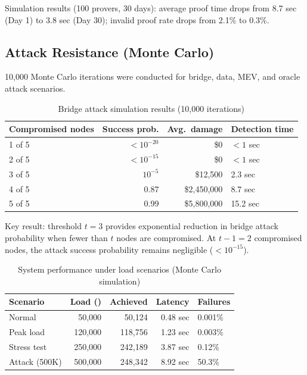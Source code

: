\documentclass[12pt,a4paper]{article}
\theoremstyle{definition}
\theoremstyle{remark}
\newcommand{\TPS}{\text{TPS}}
\begin{document}
Simulation results (100 provers, 30 days): average proof time drops from 8.7 sec (Day 1) to 3.8 sec (Day 30); invalid proof rate drops from 2.1\% to 0.3\%.

\subsection{Attack Resistance (Monte Carlo)}

10,000 Monte Carlo iterations were conducted for bridge, data, MEV, and oracle attack scenarios.

\begin{table}[H]
\centering
\small
\caption{Bridge attack simulation results (10,000 iterations)}
\label{tab:mc-bridge}
\begin{tabular}{lrrl}
\toprule
\textbf{Compromised nodes} & \textbf{Success prob.} & \textbf{Avg.\ damage} & \textbf{Detection time} \\
\midrule
1 of 5 & $< 10^{-20}$ & \$0 & $< 1$ sec \\
2 of 5 & $< 10^{-15}$ & \$0 & $< 1$ sec \\
3 of 5 & $10^{-5}$ & \$12,500 & 2.3 sec \\
4 of 5 & 0.87 & \$2,450,000 & 8.7 sec \\
5 of 5 & 0.99 & \$5,800,000 & 15.2 sec \\
\bottomrule
\end{tabular}
\end{table}

Key result: threshold $t = 3$ provides exponential reduction in bridge attack probability when fewer than $t$ nodes are compromised. At $t-1 = 2$ compromised nodes, the attack success probability remains negligible ($< 10^{-15}$).

\begin{table}[H]
\centering
\small
\caption{System performance under load scenarios (Monte Carlo simulation)}
\label{tab:mc-load}
\begin{tabular}{lrrrl}
\toprule
\textbf{Scenario} & \textbf{Load (\TPS{})} & \textbf{Achieved \TPS{}} & \textbf{Latency} & \textbf{Failures} \\
\midrule
Normal & 50,000 & 50,124 & 0.48 sec & 0.001\% \\
Peak load & 120,000 & 118,756 & 1.23 sec & 0.003\% \\
Stress test & 250,000 & 242,189 & 3.87 sec & 0.12\% \\
Attack (500K) & 500,000 & 248,342 & 8.92 sec & 50.3\% \\
\bottomrule
\end{tabular}
\end{table}
\end{document}
